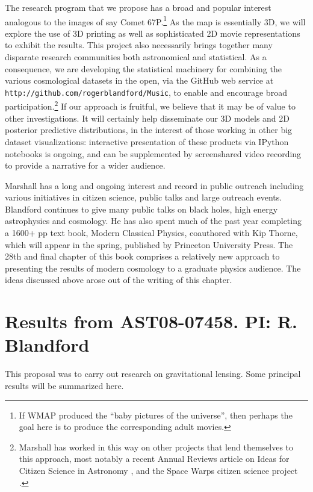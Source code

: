 \documentclass[psfig,11pt]{article}
\begin{document}
{The research program that we propose has a broad and popular interest analogous to the images of say Comet 67P.\footnote{If WMAP produced the ``baby pictures of the universe'', then perhaps the goal here is to produce the corresponding adult movies.} As the map is essentially 3D, we will explore the use of 3D printing as well as sophisticated 2D movie representations to exhibit the results. This project also necessarily brings together many disparate research communities both astronomical and statistical. As a consequence, we are developing the statistical machinery for combining the various cosmological datasets in the open, via the GitHub web service at \texttt{http://github.com/rogerblandford/Music}, to enable and encourage broad participation.\footnote{Marshall has worked in this way on other projects that lend themselves to this approach, most notably a recent Annual Reviews article on Ideas for Citizen Science in Astronomy \cite{CitSciReview}, and the Space Warps citizen science project \cite{SpaceWarps}.}
If our approach is fruitful, we believe that it may be of value to other investigations. It will certainly help disseminate our 3D models and 2D posterior predictive distributions, in the interest of those working in other big dataset visualizations: interactive presentation of these products via IPython notebooks is ongoing, and can be supplemented by screenshared video recording to provide a narrative for a wider audience.

Marshall has a long and ongoing interest and record in public outreach including various initiatives in citizen science, public talks and large outreach events.  Blandford continues to give many public talks on black holes, high energy astrophysics and cosmology. He has also spent much of the past year completing a 1600+ pp text book, Modern Classical Physics, coauthored with Kip Thorne, which will appear in the spring, published by Princeton University Press. The 28th and final chapter of this book comprises a relatively new approach to presenting the results of modern cosmology to a graduate physics audience. The ideas discussed above arose out of the writing of this chapter.



\section{Results from AST08-07458. PI: R. Blandford}

This proposal was to carry out research on gravitational lensing. Some principal results will be summarized here.
}
\end{document}
